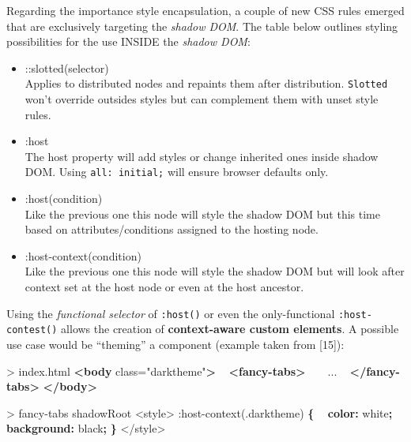 \documentclass[]{article}
\newenvironment{Shaded}{}{}
\newcommand{\KeywordTok}[1]{\textcolor[rgb]{0.00,0.44,0.13}{\textbf{{#1}}}}
\newcommand{\DataTypeTok}[1]{\textcolor[rgb]{0.56,0.13,0.00}{{#1}}}
\newcommand{\DecValTok}[1]{\textcolor[rgb]{0.25,0.63,0.44}{{#1}}}
\newcommand{\FloatTok}[1]{\textcolor[rgb]{0.25,0.63,0.44}{{#1}}}
\newcommand{\StringTok}[1]{\textcolor[rgb]{0.25,0.44,0.63}{{#1}}}
\newcommand{\OtherTok}[1]{\textcolor[rgb]{0.00,0.44,0.13}{{#1}}}
\newcommand{\ErrorTok}[1]{\textcolor[rgb]{1.00,0.00,0.00}{\textbf{{#1}}}}
\newcommand{\NormalTok}[1]{{#1}}
\providecommand{\tightlist}{%
  \setlength{\itemsep}{0pt}\setlength{\parskip}{0pt}}
\begin{document}
Regarding the importance style encapsulation, a couple of new CSS rules
emerged that are exclusively targeting the \emph{shadow DOM}. The table
below outlines styling possibilities for the use INSIDE the \emph{shadow
DOM}:

\begin{itemize}
\tightlist
\item
  ::slotted(selector)\\
  Applies to distributed nodes and repaints them after distribution.
  \texttt{Slotted} won't override outsides styles but can complement
  them with unset style rules.
\item
  :host\\
  The host property will add styles or change inherited ones inside
  shadow DOM. Using \texttt{all:\ initial;} will ensure browser defaults
  only.
\item
  :host(condition)\\
  Like the previous one this node will style the shadow DOM but this
  time based on attributes/conditions assigned to the hosting node.
\item
  :host-context(condition)\\
  Like the previous one this node will style the shadow DOM but will
  look after context set at the host node or even at the host ancestor.
\end{itemize}

Using the \emph{functional selector} of \texttt{:host()} or even the
only-functional \texttt{:host-contest()} allows the creation of
\textbf{context-aware custom elements}. A possible use case would be
``theming'' a component (example taken from {[}15{]}):

\begin{Shaded}
\begin{Highlighting}[]
\NormalTok{> index.html}
\KeywordTok{<body}\OtherTok{ class=}\StringTok{"darktheme"}\KeywordTok{>}
  \KeywordTok{<fancy-tabs>}
    \NormalTok{...}
  \KeywordTok{</fancy-tabs>}
\KeywordTok{</body>}
\end{Highlighting}
\end{Shaded}

\begin{Shaded}
\begin{Highlighting}[]
\NormalTok{> fancy-tabs shadowRoot}
\NormalTok{<style>}
\DecValTok{:}\NormalTok{host-context(}\FloatTok{.darktheme}\NormalTok{) }\KeywordTok{\{}
\ErrorTok{ } \KeywordTok{color:} \DataTypeTok{white}\KeywordTok{;}
\ErrorTok{ } \KeywordTok{background:} \DataTypeTok{black}\KeywordTok{;}
\KeywordTok{\}}
\NormalTok{</style>}
\end{Highlighting}
\end{Shaded}
\end{document}
